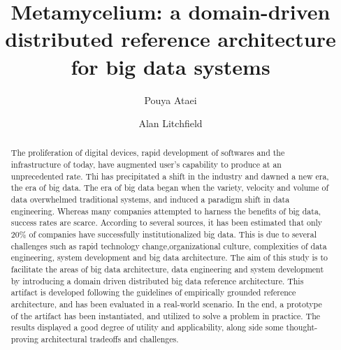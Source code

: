 \documentclass[runningheads]{llncs}
\begin{document}
%
\title{Metamycelium: a domain-driven distributed reference architecture for big data systems}
%
%
\author{Pouya Ataei \and
Alan Litchfield}
%
%
%
\maketitle              %
%
\begin{abstract}
    The proliferation of digital devices, rapid development of
    softwares and the infrastructure of today, have augmented user's capability to produce at an unprecedented rate. Thi has precipitated a shift in the industry and dawned a new era, the era of big data. The era of big data began when the variety, velocity and volume of data overwhelmed traditional systems, and induced a paradigm shift in data engineering.
    Whereas many companies attempted to harness the benefits of big data, success rates are scarce. According to several sources, it has been estimated that only 20\% of companies have successfully institutionalized big data. This is due to several challenges such as rapid technology change,organizational culture, complexities of data engineering, system development and big data architecture. The aim of this study is to facilitate the areas of big data architecture, data engineering and system development by introducing a domain driven distributed big data reference architecture. This artifact is developed following the guidelines of empirically grounded reference architecture, and has been evaluated in a real-world scenario. In the end, a prototype of the artifact has been instantiated, and utilized to solve a problem in practice. The results displayed a good
    degree of utility and applicability, along side some thought-proving architectural tradeoffs and challenges.

\end{abstract}
%
%
%
\end{document}

